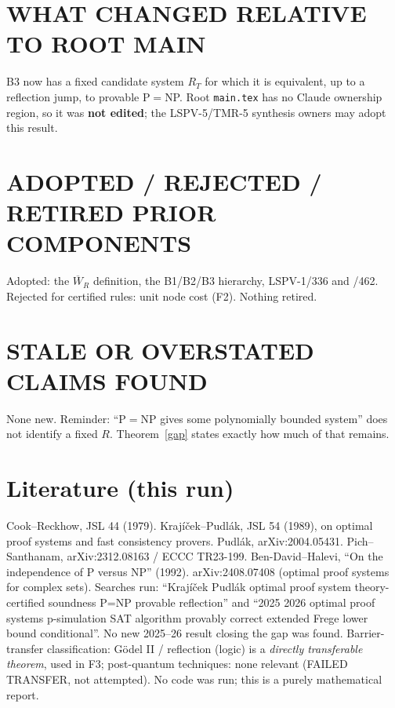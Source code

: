 \documentclass[11pt]{article}
\newcommand{\Wb}{\overline W}
\begin{document}
\section*{WHAT CHANGED RELATIVE TO ROOT MAIN}
B3 now has a fixed candidate system $R_T$ for which it is equivalent, up to a reflection jump, to provable P$=$NP. Root \texttt{main.tex} has no Claude ownership region, so it was \textbf{not edited}; the LSPV-5/TMR-5 synthesis owners may adopt this result.
\section*{ADOPTED / REJECTED / RETIRED PRIOR COMPONENTS}
Adopted: the $\Wb_R$ definition, the B1/B2/B3 hierarchy, LSPV-1/336 and /462. Rejected for certified rules: unit node cost (F2). Nothing retired.
\section*{STALE OR OVERSTATED CLAIMS FOUND}
None new. Reminder: ``P$=$NP gives some polynomially bounded system'' does not identify a fixed $R$. Theorem~\ref{gap} states exactly how much of that remains.
\section*{Literature (this run)}
Cook--Reckhow, JSL 44 (1979). Krajíček--Pudlák, JSL 54 (1989), on optimal proof systems and fast consistency provers. Pudlák, arXiv:2004.05431. Pich--Santhanam, arXiv:2312.08163 / ECCC TR23-199. Ben-David--Halevi, ``On the independence of P versus NP'' (1992). arXiv:2408.07408 (optimal proof systems for complex sets). Searches run: ``Krajíček Pudlák optimal proof system theory-certified soundness P=NP provable reflection'' and ``2025 2026 optimal proof systems p-simulation SAT algorithm provably correct extended Frege lower bound conditional''. No new 2025--26 result closing the gap was found. Barrier-transfer classification: Gödel II / reflection (logic) is a \emph{directly transferable theorem}, used in F3; post-quantum techniques: none relevant (FAILED TRANSFER, not attempted). No code was run; this is a purely mathematical report.
\end{document}
